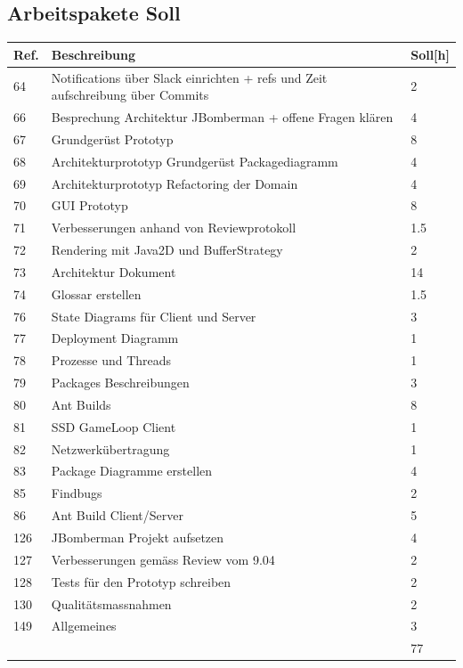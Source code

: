 \documentclass[11pt]{scrartcl}
\begin{document}
\subsection{Arbeitspakete Soll}
  \begin{tabularx} {\linewidth}{lXl}
    \bf{Ref.}  & \bf{Beschreibung} & \bf{Soll[h]} \\
    \hline
    64 & Notifications über Slack einrichten + refs und Zeit aufschreibung über Commits & 2 \\
    66 & Besprechung Architektur JBomberman + offene Fragen klären & 4 \\
    67 &  Grundgerüst Prototyp & 8 \\
    68 & Architekturprototyp Grundgerüst Packagediagramm & 4 \\
    69 &  Architekturprototyp Refactoring der Domain & 4 \\
    70 & GUI Prototyp & 8\\
    71 & 	Verbesserungen anhand von Reviewprotokoll & 1.5\\
    72 & Rendering mit Java2D und BufferStrategy & 2 \\
    73 & Architektur Dokument & 14 \\
    74 & Glossar erstellen  & 1.5 \\
    76 & State Diagrams für Client und Server & 3 \\
    77 & Deployment Diagramm & 1\\
    78 & 	Prozesse und Threads & 1 \\
    79 & 	Packages Beschreibungen & 3 \\
    80 & Ant Builds & 8 \\
    81 & SSD GameLoop Client & 1 \\
    82 & Netzwerkübertragung & 1 \\
    83 & Package Diagramme erstellen & 4 \\
    85 & 	Findbugs & 2 \\
    86 & Ant Build Client/Server & 5 \\
    126 & JBomberman Projekt aufsetzen & 4 \\
    127 & Verbesserungen gemäss Review vom 9.04 & 2 \\
    128 & Tests für den Prototyp schreiben & 2 \\
    130 & Qualitätsmassnahmen	& 2 \\
    149 & Allgemeines & 3 \\
    \hline
    & & 77
  \end{tabularx}
  
\end{document}

